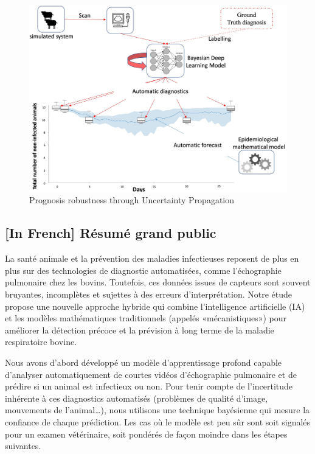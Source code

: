\begin{enumerate}
    \begin{figure}[H]
      \includegraphics[width=\linewidth]{figures/chap4/method 3.jpg}
      \caption{Prognosis robustness through Uncertainty Propagation}
      \label{fig:chap4-method3}
    \end{figure}
    
\end{enumerate}

 
\subsection{[In French] Résumé grand public} 
La santé animale et la prévention des maladies infectieuses reposent de plus en plus sur des technologies de diagnostic automatisées, comme l’échographie pulmonaire chez les bovins. Toutefois, ces données issues de capteurs sont souvent bruyantes, incomplètes et sujettes à des erreurs d’interprétation. Notre étude propose une nouvelle approche hybride qui combine l’intelligence artificielle (IA) et les modèles mathématiques traditionnels (appelés «mécanistiques») pour améliorer la détection précoce et la prévision à long terme de la maladie respiratoire bovine.

Nous avons d’abord développé un modèle d’apprentissage profond capable d’analyser automatiquement de courtes vidéos d’échographie pulmonaire et de prédire si un animal est infectieux ou non. Pour tenir compte de l’incertitude inhérente à ces diagnostics automatisés (problèmes de qualité d’image, mouvements de l’animal…), nous utilisons une technique bayésienne qui mesure la confiance de chaque prédiction. Les cas où le modèle est peu sûr sont soit signalés pour un examen vétérinaire, soit pondérés de façon moindre dans les étapes suivantes.

